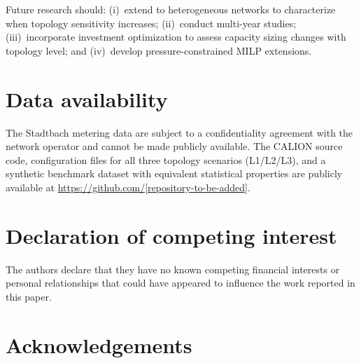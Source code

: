 \documentclass[a4paper,fleqn]{cas-dc}
\begin{document}
Future research should: (i)~extend to heterogeneous networks to characterize when topology sensitivity increases; (ii)~conduct multi-year studies; (iii)~incorporate investment optimization to assess capacity sizing changes with topology level; and (iv)~develop pressure-constrained MILP extensions.


\section*{Data availability}

The Stadtbach metering data are subject to a confidentiality agreement with the network operator and cannot be made publicly available. The CALION source code, configuration files for all three topology scenarios (L1/L2/L3), and a synthetic benchmark dataset with equivalent statistical properties are publicly available at \url{https://github.com/[repository-to-be-added]}.


\section*{Declaration of competing interest}

The authors declare that they have no known competing financial interests or personal relationships that could have appeared to influence the work reported in this paper.


\section*{Acknowledgements}



\printcredits


\appendix
\end{document}
